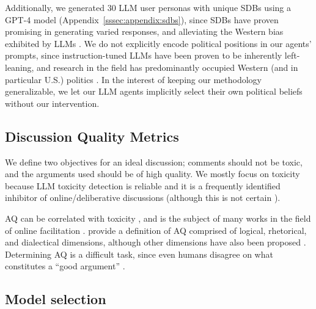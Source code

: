 Additionally, we generated 30 \ac{LLM} user personas with unique \acp{SDB} using a GPT-4 model \cite{openai2024gpt4technicalreport} (Appendix~\ref{sssec:appendix:sdbs}), since \acp{SDB} have proven promising in generating varied responses, and alleviating the Western bias exhibited by \acp{LLM} \cite{burton2024large}. We do not explicitly encode political positions in our agents' prompts, since instruction-tuned \acp{LLM} have been proven to be inherently left-leaning, and research in the field has predominantly occupied Western (and in particular U.S.) politics \cite{Taubenfeld2024SystematicBI, potter-etal-2024-hidden, political_2024, pit2024oninvestigatingpoliticalstance}. In the interest of keeping our methodology generalizable, we let our \ac{LLM} agents implicitly select their own political beliefs without our intervention.


\subsection{Discussion Quality Metrics}
\label{ssec:experimental:metrics}

We define two objectives for an ideal discussion; comments should not be toxic, and the arguments used should be of high quality. We mostly focus on toxicity because \ac{LLM} toxicity detection is reliable \citep{kang-qian-2024-implanting, Wang2022ToxicityDW, anjum2024hate} and it is a frequently identified inhibitor of online/deliberative discussions \citep{dekock2022disagree, XiaToxicity} (although this is not certain \citep{Avalle2024PersistentIP}). 

\ac{AQ} can be correlated with toxicity \cite{chang-danescu-niculescu-mizil-2019-trouble}, and is the subject of many works in the field of online facilitation \cite{argyle2023, schroeder-etal-2024-fora, falk-etal-2024-moderation, falk-etal-2021-predicting}. \citet{wachsmuth-etal-2017-computational} provide a definition of \ac{AQ} comprised of logical, rhetorical, and dialectical dimensions, although other dimensions have also been proposed \cite{habernal-gurevych-2016-argument, persing-ng-2015-modeling}. Determining \ac{AQ} is a difficult task, since even humans disagree on what constitutes a “good argument” \cite{wachsmuth-etal-2017-computational, argyle2023}. 


\subsection{Model selection}
\label{ssec:experimental:model}

